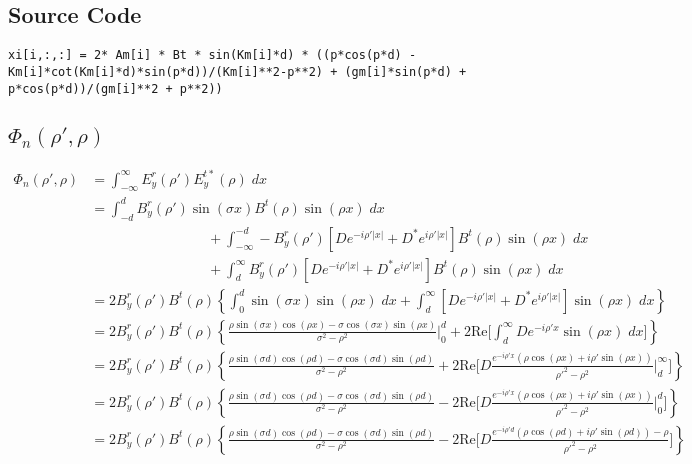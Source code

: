 \documentclass[11pt, oneside]{article}   	%
\begin{document}
\subsection{Source Code}

\begin{lstlisting}
xi[i,:,:] = 2* Am[i] * Bt * sin(Km[i]*d) * ((p*cos(p*d) - Km[i]*cot(Km[i]*d)*sin(p*d))/(Km[i]**2-p**2) + (gm[i]*sin(p*d) + p*cos(p*d))/(gm[i]**2 + p**2))
\end{lstlisting}

\subsection{$\Phi_{n}(\rho ',\rho)$}

\begin{align*}
\Phi_{n}(\rho ', \rho) &= \int_{-\infty}^{\infty} E_{y}^{r}(\rho ') E_{y}^{t*}(\rho) \; dx \\
&= \int_{-d}^{d} B^{r}_{y}(\rho ')\sin(\sigma x) B^{t}(\rho) \sin(\rho x) \; dx \\ 
	&\hspace{100pt} + \int_{-\infty}^{-d} -B^{r}_{y}(\rho ')[De^{-i\rho ' |x|} + D^{*}e^{i\rho '|x|}] B^{t}(\rho)\sin(\rho x)\; dx \\
	&\hspace{100pt} + \int_{d}^{\infty}     B^{r}_{y}(\rho ')[De^{-i\rho ' |x|} + D^{*}e^{i\rho '|x|}] B^{t}(\rho)\sin(\rho x)\; dx \\
&= 2 B^{r}_{y}(\rho ') B^{t}(\rho) \left\{\int_{0}^{d} \sin(\sigma x) \sin(\rho x) \; dx + \int_{d}^{\infty} [De^{-i\rho ' |x|} + D^{*}e^{i\rho '|x|}] \sin(\rho x)\; dx \right\} \\
&= 2 B^{r}_{y}(\rho ') B^{t}(\rho) \left\{ \frac{\rho\sin(\sigma x)\cos(\rho x) - \sigma \cos(\sigma x) \sin(\rho x)}{\sigma^{2} - \rho^{2}} \bigg|_{0}^{d} + 2\text{Re} \bigg[ \int_{d}^{\infty} De^{-i\rho ' x} \sin(\rho x)\; dx \bigg] \right\} \\
&= 2 B^{r}_{y}(\rho ') B^{t}(\rho) \left\{ \frac{\rho\sin(\sigma d)\cos(\rho d) - \sigma \cos(\sigma d) \sin(\rho d)}{\sigma^{2} - \rho^{2}} + 2\text{Re} \bigg[ D\frac{e^{-i\rho ' x}(\rho \cos(\rho x) + i\rho ' \sin(\rho x))}{\rho'^{2} - \rho^{2}} \bigg|_{d}^{\infty} \bigg] \right\} \\
&= 2 B^{r}_{y}(\rho ') B^{t}(\rho) \left\{ \frac{\rho\sin(\sigma d)\cos(\rho d) - \sigma \cos(\sigma d) \sin(\rho d)}{\sigma^{2} - \rho^{2}} - 2\text{Re} \bigg[ D\frac{e^{-i\rho ' x}(\rho \cos(\rho x) + i\rho ' \sin(\rho x))}{\rho'^{2} - \rho^{2}} \bigg|_{0}^{d} \bigg] \right\} \\
&= 2 B^{r}_{y}(\rho ') B^{t}(\rho) \left\{ \frac{\rho\sin(\sigma d)\cos(\rho d) - \sigma \cos(\sigma d) \sin(\rho d)}{\sigma^{2} - \rho^{2}} - 2\text{Re} \bigg[ D\frac{e^{-i\rho ' d}(\rho \cos(\rho d) + i\rho ' \sin(\rho d)) - \rho}{\rho'^{2} - \rho^{2}} \bigg] \right\} \\
\end{align*}
\end{document}
